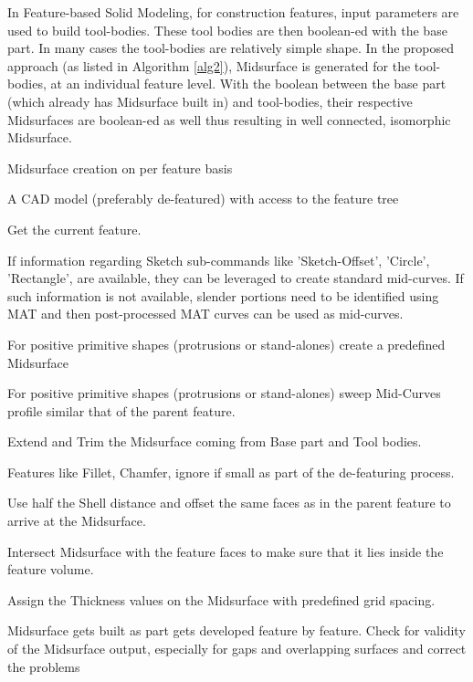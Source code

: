 In Feature-based Solid Modeling, for construction features,  input parameters are used to build tool-bodies. These tool bodies are then boolean-ed with the base part. In many cases the tool-bodies are relatively simple shape. In the proposed approach  (as listed in Algorithm \ref{alg2}), Midsurface is generated for the tool-bodies, at an individual feature level. With the boolean between the base part (which already has Midsurface built in) and tool-bodies, their respective Midsurfaces are boolean-ed as well thus resulting in well connected, isomorphic Midsurface. 

\begin{algorithm}

	\caption{Midsurface creation on per feature basis }

	\label{alg2}

	\begin{algorithmic}

		\REQUIRE A CAD model (preferably de-featured) with access to the feature tree


			\STATE Get the current feature.

				\STATE  If information regarding Sketch sub-commands like 'Sketch-Offset', 'Circle', 'Rectangle', are available, they can be leveraged to create standard mid-curves. 
				\STATE If such information is not available, slender portions need to be identified using MAT and then post-processed MAT curves can be used as mid-curves.
			\ENDIF

				\STATE  For positive primitive shapes (protrusions or stand-alones) create a predefined Midsurface
			\ENDIF

				\STATE For positive primitive shapes (protrusions or stand-alones) sweep Mid-Curves profile similar that of the parent feature.
			\ENDIF

				\STATE Extend and Trim the Midsurface coming from Base part and Tool bodies.
			\ENDIF

				\STATE Features like Fillet, Chamfer, ignore if small as part of the de-featuring process.
			\ENDIF

				\STATE  Use half the Shell distance and offset the same faces as in the parent feature to arrive at the Midsurface.
			\ENDIF

			\STATE Intersect Midsurface with the feature faces to make sure that it lies inside the feature volume.

			\STATE Assign the Thickness values on the Midsurface with predefined grid spacing.

		\ENDWHILE
		\STATE Midsurface gets built as part gets developed feature by feature.
		\STATE Check for validity of the Midsurface output, especially for gaps and overlapping surfaces and correct the problems

	\end{algorithmic}

\end{algorithm}


